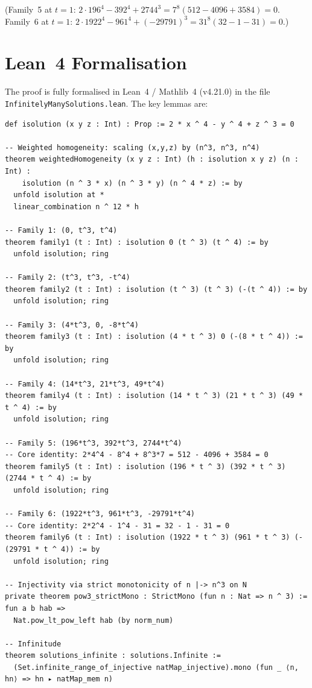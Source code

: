 \documentclass[12pt,a4paper]{article}
\theoremstyle{definition}
\begin{document}
\noindent
(Family~5 at $t=1$: $2\cdot 196^4 - 392^4 + 2744^3 = 7^8(512-4096+3584)=0$.
 Family~6 at $t=1$: $2\cdot 1922^4 - 961^4 + (-29791)^3 = 31^8(32-1-31)=0$.)

\section{Lean~4 Formalisation}\label{sec:lean}

The proof is fully formalised in Lean~4 / Mathlib~4 (v4.21.0) in the file
\texttt{InfinitelyManySolutions.lean}.  The key lemmas are:

\begin{lstlisting}[language=Lean4]
def isolution (x y z : Int) : Prop := 2 * x ^ 4 - y ^ 4 + z ^ 3 = 0

-- Weighted homogeneity: scaling (x,y,z) by (n^3, n^3, n^4)
theorem weightedHomogeneity (x y z : Int) (h : isolution x y z) (n : Int) :
    isolution (n ^ 3 * x) (n ^ 3 * y) (n ^ 4 * z) := by
  unfold isolution at *
  linear_combination n ^ 12 * h

-- Family 1: (0, t^3, t^4)
theorem family1 (t : Int) : isolution 0 (t ^ 3) (t ^ 4) := by
  unfold isolution; ring

-- Family 2: (t^3, t^3, -t^4)
theorem family2 (t : Int) : isolution (t ^ 3) (t ^ 3) (-(t ^ 4)) := by
  unfold isolution; ring

-- Family 3: (4*t^3, 0, -8*t^4)
theorem family3 (t : Int) : isolution (4 * t ^ 3) 0 (-(8 * t ^ 4)) := by
  unfold isolution; ring

-- Family 4: (14*t^3, 21*t^3, 49*t^4)
theorem family4 (t : Int) : isolution (14 * t ^ 3) (21 * t ^ 3) (49 * t ^ 4) := by
  unfold isolution; ring

-- Family 5: (196*t^3, 392*t^3, 2744*t^4)
-- Core identity: 2*4^4 - 8^4 + 8^3*7 = 512 - 4096 + 3584 = 0
theorem family5 (t : Int) : isolution (196 * t ^ 3) (392 * t ^ 3) (2744 * t ^ 4) := by
  unfold isolution; ring

-- Family 6: (1922*t^3, 961*t^3, -29791*t^4)
-- Core identity: 2*2^4 - 1^4 - 31 = 32 - 1 - 31 = 0
theorem family6 (t : Int) : isolution (1922 * t ^ 3) (961 * t ^ 3) (-(29791 * t ^ 4)) := by
  unfold isolution; ring

-- Injectivity via strict monotonicity of n |-> n^3 on N
private theorem pow3_strictMono : StrictMono (fun n : Nat => n ^ 3) := fun a b hab =>
  Nat.pow_lt_pow_left hab (by norm_num)

-- Infinitude
theorem solutions_infinite : solutions.Infinite :=
  (Set.infinite_range_of_injective natMap_injective).mono (fun _ ⟨n, hn⟩ => hn ▸ natMap_mem n)
\end{lstlisting}
\end{document}
